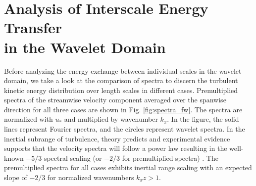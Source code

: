 \section{Analysis of Interscale Energy Transfer \\ in the Wavelet Domain}
\label{Analysis of inter-scale energy transfer in wavelet domain} 

Before analyzing the energy exchange between individual scales in the wavelet domain, we take a look at the comparison of spectra to discern the turbulent kinetic energy distribution over length scales in different cases.  Premultiplied spectra of the streamwise velocity component averaged over the spanwise direction for all three cases are shown in Fig. \ref{fig:spectra_fw}.  The spectra are normalized with $u_*$ and multiplied by wavenumber $k_{x}$. In the figure, the solid lines represent Fourier spectra, and the circles represent wavelet spectra. In the inertial subrange of turbulence, theory predicts and experimental evidence supports that the velocity spectra will follow a power law resulting in the well-known $-5/3$ spectral scaling (or $-2/3$ for premultiplied spectra) \citep{perry_chng_jfm_86}. The premultiplied spectra for all cases exhibits inertial range scaling with an expected slope of $-2/3$ for normalized wavenumbers $k_xz > 1$. 

